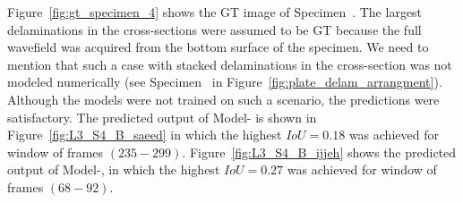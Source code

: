 Figure~\ref{fig:gt_specimen_4} shows the GT image of Specimen~.
The largest delaminations in the cross-sections were assumed to be GT because the full wavefield was acquired from the bottom surface of the specimen.
We need to mention that such a case with stacked delaminations in the 
cross-section was not modeled numerically (see Specimen~ in 
Figure~\ref{fig:plate_delam_arrangment}).
Although the models were not trained on such a scenario, the predictions were satisfactory.
The predicted output of Model- is shown in 
Figure~\ref{fig:L3_S4_B_saeed} in which the highest \(IoU=0.18\) was achieved 
for window of frames \((235-299)\).
Figure~\ref{fig:L3_S4_B_ijjeh} shows the predicted output of Model-, in which the highest \(IoU=0.27\) was achieved for window of frames \((68-92)\).
\onecolumn
